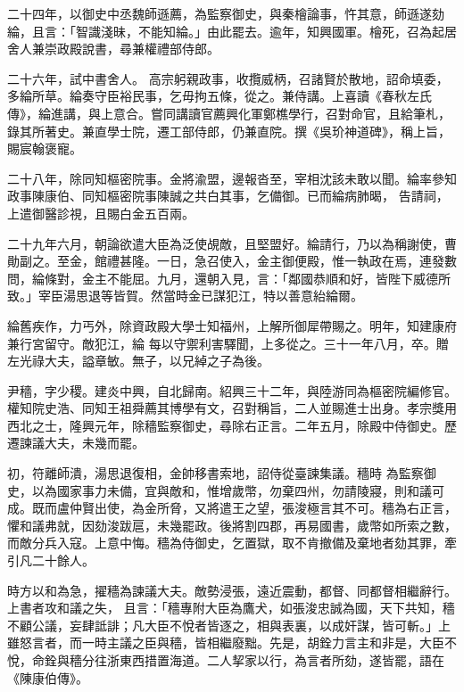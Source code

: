 \begin{pinyinscope}
 二十四年，以御史中丞魏師遜薦，為監察御史，與秦檜論事，忤其意，師遜遂劾綸，且言：「智識淺昧，不能知綸。」由此罷去。逾年，知興國軍。檜死，召為起居舍人兼崇政殿說書，尋兼權禮部侍郎。



 二十六年，試中書舍人。
 高宗躬親政事，收攬威柄，召諸賢於散地，詔命填委，多綸所草。綸奏守臣裕民事，乞毋拘五條，從之。兼侍講。上喜讀《春秋左氏傳》，綸進講，與上意合。嘗同講讀官薦興化軍鄭樵學行，召對命官，且給筆札，錄其所著史。兼直學士院，遷工部侍郎，仍兼直院。撰《吳玠神道碑》，稱上旨，賜宸翰褒寵。



 二十八年，除同知樞密院事。金將渝盟，邊報沓至，宰相沈該未敢以聞。綸率參知政事陳康伯、同知樞密院事陳誠之共白其事，乞備御。已而綸病肺暍，
 告請祠，上遣御醫診視，且賜白金五百兩。



 二十九年六月，朝論欲遣大臣為泛使覘敵，且堅盟好。綸請行，乃以為稱謝使，曹勛副之。至金，館禮甚隆。一日，急召使入，金主御便殿，惟一執政在焉，連發數問，綸條對，金主不能屈。九月，還朝入見，言：「鄰國恭順和好，皆陛下威德所致。」宰臣湯思退等皆賀。然當時金已謀犯江，特以善意紿綸爾。



 綸舊疾作，力丐外，除資政殿大學士知福州，上解所御犀帶賜之。明年，知建康府兼行宮留守。敵犯江，綸
 每以守禦利害驛聞，上多從之。三十一年八月，卒。贈左光祿大夫，謚章敏。無子，以兄綽之子為後。



 尹穡，字少稷。建炎中興，自北歸南。紹興三十二年，與陸游同為樞密院編修官。權知院史浩、同知王祖舜薦其博學有文，召對稱旨，二人並賜進士出身。孝宗獎用西北之士，隆興元年，除穡監察御史，尋除右正言。二年五月，除殿中侍御史。歷遷諫議大夫，未幾而罷。



 初，符離師潰，湯思退復相，金帥移書索地，詔侍從臺諫集議。穡時
 為監察御史，以為國家事力未備，宜與敵和，惟增歲幣，勿棄四州，勿請陵寢，則和議可成。既而盧仲賢出使，為金所脅，又將遣王之望，張浚極言其不可。穡為右正言，懼和議弗就，因劾浚跋扈，未幾罷政。後將割四郡，再易國書，歲幣如所索之數，而敵分兵入寇。上意中悔。穡為侍御史，乞置獄，取不肯撤備及棄地者劾其罪，牽引凡二十餘人。



 時方以和為急，擢穡為諫議大夫。敵勢浸張，遠近震動，都督、同都督相繼辭行。上書者攻和議之失，
 且言：「穡專附大臣為鷹犬，如張浚忠誠為國，天下共知，穡不顧公議，妄肆詆誹；凡大臣不悅者皆逐之，相與表裏，以成奸謀，皆可斬。」上雖怒言者，而一時主議之臣與穡，皆相繼廢黜。先是，胡銓力言主和非是，大臣不悅，命銓與穡分往浙東西措置海道。二人挈家以行，為言者所劾，遂皆罷，語在《陳康伯傳》。




\end{pinyinscope}
